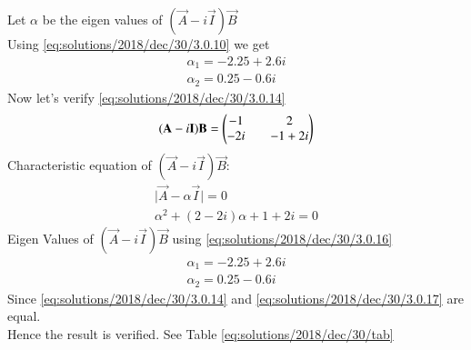  Let $\alpha$ be the eigen values of $(\vec{A}-i\vec{I})\vec{B}$ \\
 Using \eqref{eq:solutions/2018/dec/30/3.0.10} we get 
 \begin{equation}\label{eq:solutions/2018/dec/30/3.0.14}
 \begin{split}
 \alpha_1 = -2.25 + 2.6i \\
 \alpha_2 = 0.25 - 0.6i
 \end{split}
 \end{equation}
 Now let's verify \eqref{eq:solutions/2018/dec/30/3.0.14}
 \begin{equation}\label{eq:solutions/2018/dec/30/3.0.15}
 (\mathbf{A}-i\mathbf{I})\mathbf{B} = \begin{pmatrix}-1 && 2 \\ -2i && -1+2i\end{pmatrix}
 \end{equation}
 Characteristic equation of $(\vec{A}-i\vec{I})\vec{B}$:
 \begin{equation}\label{eq:solutions/2018/dec/30/3.0.16}
 \begin{split}
 \vert\vec{A}-\alpha\vec{I}\vert = 0\\
 \alpha^2 + (2-2i)\alpha + 1 + 2i = 0
 \end{split}
 \end{equation}
 Eigen Values of $(\vec{A}-i\vec{I})\vec{B}$ using \eqref{eq:solutions/2018/dec/30/3.0.16}  
 \begin{equation}\label{eq:solutions/2018/dec/30/3.0.17}
 \begin{split}
 \alpha_1 = -2.25 + 2.6i\\
 \alpha_2 = 0.25 - 0.6i
 \end{split}
 \end{equation}
 Since \eqref{eq:solutions/2018/dec/30/3.0.14} and \eqref{eq:solutions/2018/dec/30/3.0.17} are equal.\\
 Hence the result is verified.  See Table \ref{eq:solutions/2018/dec/30/tab}

